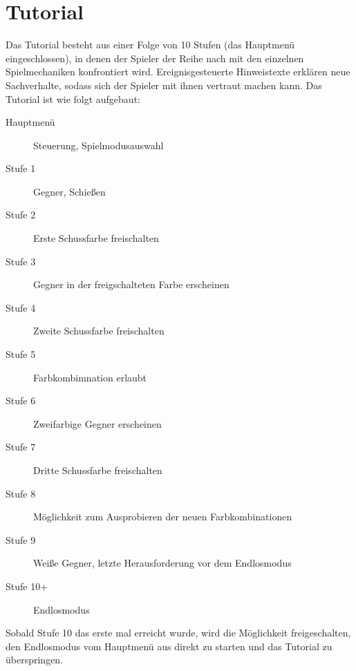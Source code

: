 \section{Tutorial}

Das Tutorial besteht aus einer Folge von 10 Stufen (das Hauptmenü eingeschlossen), in denen der Spieler der Reihe nach mit den einzelnen Spielmechaniken konfrontiert wird. Ereignisgesteuerte Hinweistexte erklären neue Sachverhalte, sodass sich der Spieler mit ihnen vertraut machen kann. Das Tutorial ist wie folgt aufgebaut:

\begin{description}
\item[Hauptmenü] Steuerung, Spielmodusauswahl
\item[Stufe 1] Gegner, Schie{\ss}en
\item[Stufe 2] Erste Schussfarbe freischalten
\item[Stufe 3] Gegner in der freigschalteten Farbe erscheinen
\item[Stufe 4] Zweite Schussfarbe freischalten
\item[Stufe 5] Farbkombimnation erlaubt
\item[Stufe 6] Zweifarbige Gegner erscheinen
\item[Stufe 7] Dritte Schussfarbe freischalten
\item[Stufe 8] Möglichkeit zum Ausprobieren der neuen Farbkombinationen
\item[Stufe 9] Wei{\ss}e Gegner, letzte Herausforderung vor dem Endlosmodus
\item[Stufe 10+] Endlosmodus
\end{description}

Sobald Stufe 10 das erste mal erreicht wurde, wird die Möglichkeit freigeschalten, den Endlosmodus vom Hauptmenü aus direkt zu starten und das Tutorial zu überspringen.
